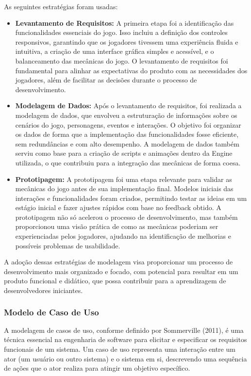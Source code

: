 As seguintes estratégias foram usadas:

\begin{itemize}
    \item \textbf{Levantamento de Requisitos:} A primeira etapa foi a identificação das funcionalidades essenciais do jogo. Isso incluiu a definição dos controles responsivos, garantindo que os jogadores tivessem uma experiência fluida e intuitiva, a criação de uma interface gráfica simples e acessível, e o balanceamento das mecânicas do jogo. O levantamento de requisitos foi fundamental para alinhar as expectativas do produto com as necessidades dos jogadores, além de facilitar as decisões durante o processo de desenvolvimento.

    \item \textbf{Modelagem de Dados:} Após o levantamento de requisitos, foi realizada a modelagem de dados, que envolveu a estruturação de informações sobre os cenários do jogo, personagens, eventos e interações. O objetivo foi organizar os dados de forma que a implementação das funcionalidades fosse eficiente, sem redundâncias e com alto desempenho. A modelagem de dados também serviu como base para a criação de scripts e animações dentro da Engine utilizada, o que contribuiu para a integração das mecânicas de forma coesa.

    \item \textbf{Prototipagem:} A prototipagem foi uma etapa relevante para validar as mecânicas do jogo antes de sua implementação final. Modelos iniciais das interações e funcionalidades foram criados, permitindo testar as ideias em um estágio inicial e fazer ajustes rápidos com base no feedback obtido. A prototipagem não só acelerou o processo de desenvolvimento, mas também proporcionou uma visão prática de como as mecânicas poderiam ser experienciadas pelos jogadores, ajudando na identificação de melhorias e possíveis problemas de usabilidade.
\end{itemize}

A adoção dessas estratégias de modelagem visa proporcionar um processo de desenvolvimento mais organizado e focado, com potencial para resultar em um produto funcional e didático, que possa contribuir para a aprendizagem de desenvolvedores iniciantes.

\subsubsection{Modelo de Caso de Uso}

A modelagem de casos de uso, conforme definido por Sommerville (2011), é uma técnica essencial na engenharia de software para elicitar e especificar os requisitos funcionais de um sistema. Um caso de uso representa uma interação entre um ator (um usuário ou outro sistema) e o sistema em si, descrevendo uma sequência de ações que o ator realiza para atingir um objetivo específico.

